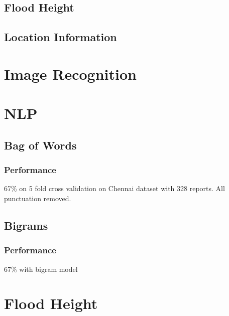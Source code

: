 \subsection{Flood Height}
\subsection{Location Information}

\section{Image Recognition}
\section{NLP}

	\subsection{Bag of Words}
	\subsubsection{Performance}
	67\% on 5 fold cross validation on Chennai dataset with 328 reports. All
	punctuation removed.
		
	\subsection{Bigrams}
	\subsubsection{Performance}
	67\% with bigram model

\section{Flood Height}
